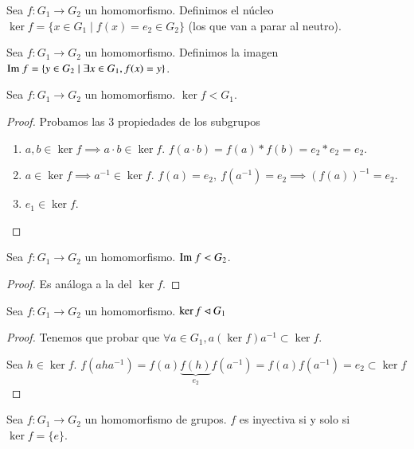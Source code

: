 \begin{dfn}
	Sea $f:G_1 \to G_2$ un homomorfismo. Definimos el núcleo $\ker f = \{x \in G_1 \mid f(x) = e_2 \in G_2\}$ (los que van a parar al neutro).
\end{dfn}

\begin{dfn}
	Sea $f:G_1 \to G_2$ un homomorfismo. Definimos la imagen $\text{Im } f = \{y \in G_2 \mid \exists x \in G_1, f(x) = y\}$.
\end{dfn}

\begin{pro}Sea $f: G_1 \to G_2$ un homomorfismo. $\ker f < G_1$.
\end{pro}

\begin{proof} Probamos las 3 propiedades de los subgrupos
	\begin{enumerate}
		\item $a,b \in \ker f \implies a \cdot b \in \ker f$. $f(a \cdot b) = f(a) \ast f(b) = e_2 \ast e_2 = e_2$.
		\item $a \in \ker f \implies a^{-1} \in \ker f$. $f(a) = e_2,\ f(a^{-1}) = e_2 \implies (f(a))^{-1} = e_2$.
		\item $e_1 \in \ker f$.
	\end{enumerate}
\end{proof}

\begin{thm}
	Sea $f: G_1 \to G_2$ un homomorfismo. $\text{Im } f < G_2$.
\end{thm}

\begin{proof} Es análoga a la del $\ker f$.\end{proof}

\begin{thm}
	Sea $f : G_1 \to G_2$ un homomorfismo. $\ker f \lhd G_1$
\end{thm}

\begin{proof}
	Tenemos que probar que $\forall a \in G_1, a (\ker f) a^{-1} \subset \ker f$.
	
	Sea $h \in \ker f$. $f(a h a^{-1}) = f(a)\underbrace{f(h)}_{e_2}f(a^{-1}) = f(a)f(a^{-1}) = e_2\subset \ker f$
\end{proof}

\begin{pro}
	Sea $f:G_1 \to G_2$ un homomorfismo de grupos. $f$ es inyectiva si y solo si $\ker f = \{e\}$.
\end{pro}

